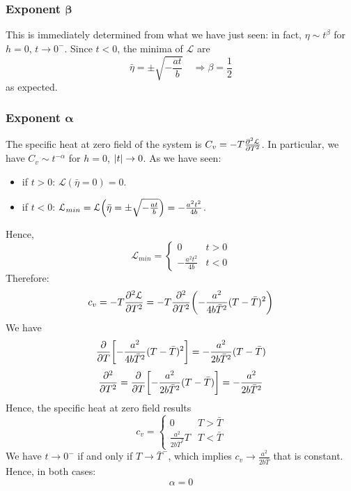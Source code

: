\documentclass[../../Main/Main.tex]{subfiles}
\begin{document}
\subsubsection{Exponent \( \pmb{\beta}  \)}
This is immediately determined from what we have just seen: in fact, \( \eta \sim t^\beta  \) for \( h=0 \), \( t \rightarrow 0^- \). Since \( t<0 \), the minima of \( \mathcal{L} \) are
\begin{equation*}
  \bar{\eta } = \pm \sqrt{- \frac{at}{b}} \quad \Rightarrow  \beta = \frac{1}{2}
\end{equation*}
as expected.

\subsubsection{Exponent \( \pmb{\alpha}  \)}
The specific heat at zero field of the system is \(   C_v = - T \pdv[2]{\mathcal{L}}{T} \).
In particular, we have \( C _v \sim t^{-\alpha } \) for  \( h=0 \), \( \abs{t}  \rightarrow 0 \).
As we have seen:

\begin{itemize}
\item if \( t>0 \):  \( \mathcal{L} (\bar{\eta }=0 )= 0 \).
\item if \( t < 0 \): \( \mathcal{L}_{min} = \mathcal{L} \qty(\bar{\eta } = \pm \sqrt{- \frac{at}{b}}  ) = - \frac{a^2t^2}{4b}  \).
\end{itemize}
Hence,
\begin{equation*}
  \mathcal{L}_{min} =
    \begin{cases}
     0 & t > 0\\
     - \frac{a^2 t^2}{4b} & t < 0
    \end{cases}
\end{equation*}
Therefore:
\begin{equation*}
  c_v = - T \pdv[2]{\mathcal{L}}{T} = - T \pdv[2]{}{T} \qty(- \frac{a^2}{4b \bar{T}^2 }(T- \bar{T} )^2)
\end{equation*}
We have
\begin{equation*}
  \pdv{}{T} (\dots) \qty[- \frac{a^2}{4b \bar{T}^2 }(T- \bar{T} )^2 ] = - \frac{a^2}{2 b \bar{T}^2 } (T- \bar{T} )
\end{equation*}
\begin{equation*}
  \pdv[2]{}{T} = \pdv{}{T} \qty[ - \frac{a^2}{2 b \bar{T}^2 } (T- \bar{T} )]   = - \frac{a^2}{2 b \bar{T}^2 }
\end{equation*}
Hence, the specific heat at zero field results
\begin{equation*}
c_v =
  \begin{cases}
   0 & T > \bar{T} \\
   \frac{a^2}{2 b \bar{T}^2 } T & T < \bar{T}
  \end{cases}
\end{equation*}
We have \( t \rightarrow 0^- \) if and only if \( T \rightarrow \bar{T}^-  \), which implies \( c_v \rightarrow \frac{a^2}{2b \bar{T} } \) that is constant. Hence, in both cases:
\begin{equation*}
  \alpha =0
\end{equation*}
\end{document}
